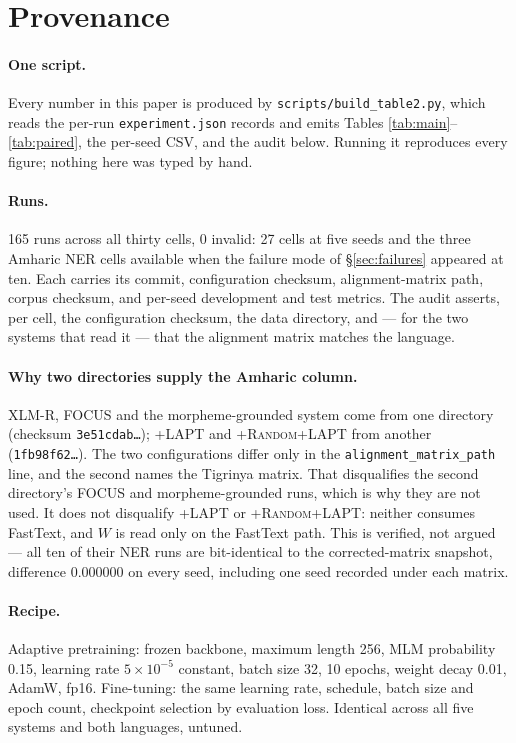 \documentclass[11pt]{article}
\begin{document}


\appendix

\section{Provenance}
\label{app:prov}

\paragraph{One script.} Every number in this paper is produced by
\texttt{scripts/build\_table2.py}, which reads the per-run
\texttt{experiment.json} records and emits Tables
\ref{tab:main}--\ref{tab:paired}, the per-seed CSV, and the audit below.
Running it reproduces every figure; nothing here was typed by hand.

\paragraph{Runs.} 165 runs across all thirty cells, 0 invalid: 27 cells at
five seeds and the three Amharic NER cells available when the failure mode of
\S\ref{sec:failures} appeared at ten. Each carries its commit, configuration
checksum, alignment-matrix path, corpus checksum, and per-seed development
and test metrics. The audit asserts, per cell, the configuration checksum,
the data directory, and --- for the two systems that read it --- that the
alignment matrix matches the language.

\paragraph{Why two directories supply the Amharic column.} XLM-R, FOCUS and
the morpheme-grounded system come from one directory
(checksum \texttt{3e51cdab\ldots}); \textsc{+LAPT} and
\textsc{+Random+LAPT} from another (\texttt{1fb98f62\ldots}). The two
configurations differ only in the \texttt{alignment\_matrix\_path} line, and
the second names the Tigrinya matrix. That disqualifies the second
directory's FOCUS and morpheme-grounded runs, which is why they are not used.
It does not disqualify \textsc{+LAPT} or \textsc{+Random+LAPT}: neither
consumes FastText, and $W$ is read only on the FastText path. This is
verified, not argued --- all ten of their NER runs are bit-identical to the
corrected-matrix snapshot, difference 0.000000 on every seed, including one
seed recorded under each matrix.

\paragraph{Recipe.} Adaptive pretraining: frozen backbone, maximum length
256, MLM probability 0.15, learning rate $5\times10^{-5}$ constant, batch
size 32, 10 epochs, weight decay 0.01, AdamW, fp16. Fine-tuning: the same
learning rate, schedule, batch size and epoch count, checkpoint selection by
evaluation loss. Identical across all five systems and both languages,
untuned.
\end{document}
